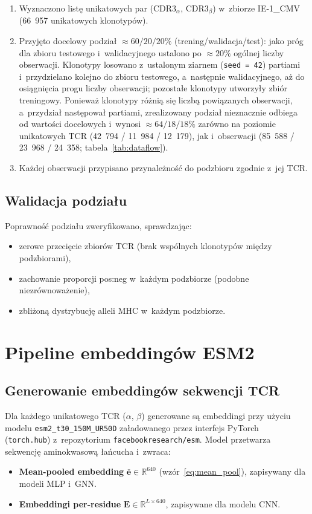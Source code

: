 \documentclass{SGGW-thesis}
\begin{document}
\begin{enumerate}
  \item Wyznaczono listę unikatowych par (CDR3$_\alpha$, CDR3$_\beta$) w~zbiorze IE-1\_CMV
        (66~957 unikatowych klonotypów).
  \item Przyjęto docelowy podział ${\approx}60/20/20\%$ (trening/walidacja/test): jako próg dla
        zbioru testowego i~walidacyjnego ustalono po ${\approx}20\%$ ogólnej liczby obserwacji.
        Klonotypy losowano z~ustalonym ziarnem (\texttt{seed = 42}) partiami i~przydzielano kolejno
        do zbioru testowego, a~następnie walidacyjnego, aż do osiągnięcia progu liczby obserwacji;
        pozostałe klonotypy utworzyły zbiór treningowy. Ponieważ klonotypy różnią się liczbą
        powiązanych obserwacji, a~przydział następował partiami, zrealizowany podział nieznacznie
        odbiega od wartości docelowych i~wynosi ${\approx}64/18/18\%$ zarówno na poziomie
        unikatowych TCR (42~794 / 11~984 / 12~179), jak i~obserwacji
        (85~588 / 23~968 / 24~358; tabela~\ref{tab:dataflow}).
  \item Każdej obserwacji przypisano przynależność do podzbioru zgodnie z~jej TCR.
\end{enumerate}

\subsection{Walidacja podziału}

Poprawność podziału zweryfikowano, sprawdzając:
\begin{itemize}
  \item zerowe przecięcie zbiorów TCR (brak wspólnych klonotypów między podzbiorami),
  \item zachowanie proporcji pos:neg w~każdym podzbiorze (podobne niezrównoważenie),
  \item zbliżoną dystrybucję alleli MHC w~każdym podzbiorze.
\end{itemize}

\section{Pipeline embeddingów ESM2}

\subsection{Generowanie embeddingów sekwencji TCR}

Dla każdego unikatowego TCR ($\alpha$, $\beta$) generowane są embeddingi przy użyciu modelu
\texttt{esm2\_t30\_150M\_UR50D} załadowanego przez interfejs PyTorch~\cite{paszke2019} (\texttt{torch.hub}) z~repozytorium
\texttt{facebookresearch/esm}. Model przetwarza sekwencję aminokwasową łańcucha i~zwraca:
\begin{itemize}
  \item \textbf{Mean-pooled embedding} $\bar{\mathbf{e}} \in \mathbb{R}^{640}$ (wzór~\eqref{eq:mean_pool}),
        zapisywany dla modeli MLP i~GNN.
  \item \textbf{Embeddingi per-residue} $\mathbf{E} \in \mathbb{R}^{L \times 640}$, zapisywane
        dla modelu CNN.
\end{itemize}
\end{document}
